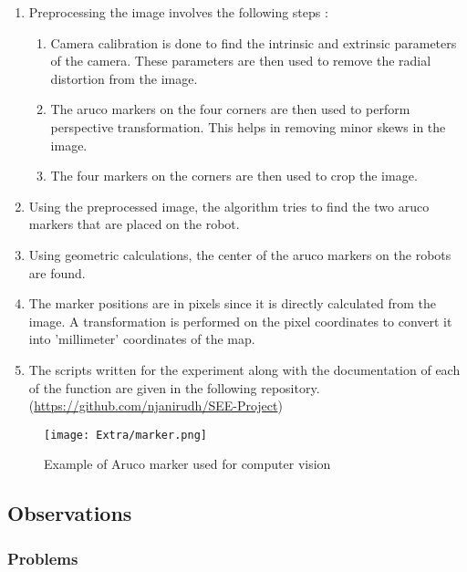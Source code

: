 \documentclass[10pt,a4paper]{article}
\begin{document}
\begin{enumerate}
		\item
		Preprocessing the image involves the following steps :
		\vspace{0.2cm}
		\begin{enumerate}
			\item
			Camera calibration is done to find the intrinsic and extrinsic parameters of the camera.	These parameters are then used to remove the radial distortion from the image.
			\item
			The aruco markers on the four corners are then used to perform perspective transformation. This helps in removing minor skews in the image.
			\item
			The four markers on the corners are then used to crop the image.			
		\end{enumerate}
		\vspace{0.3cm}
		\item
		Using the preprocessed image, the algorithm tries to find the two aruco markers that are placed on the robot.
		\item
		Using geometric calculations, the center of the aruco markers on the robots are found. 
		\item
		The marker positions are in pixels since it is directly calculated from the image. A transformation is performed on the pixel coordinates to convert it into 'millimeter' coordinates of the map.
		\item
		The scripts written for the experiment along with the documentation of each of the function are given in the following repository. (\href{https://github.com/njanirudh/SEE-Project}{https://github.com/njanirudh/SEE-Project})
\end{enumerate}

\vspace{0.5cm}

\begin{figure}[h]
	\centering
	\texttt{[image: Extra/marker.png]}
	\caption{ Example of Aruco marker used for computer vision}
\end{figure}



\subsection{Observations}

\subsubsection{Problems}
\end{document}
